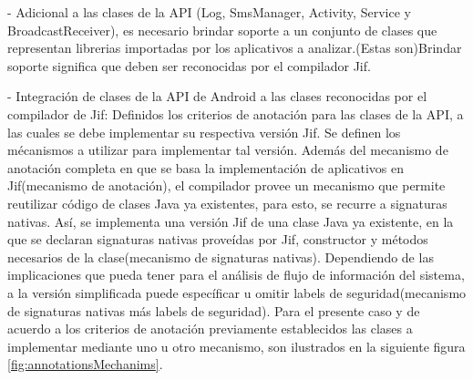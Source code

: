 - Adicional a las clases de la API (Log, SmsManager, Activity, Service y
BroadcastReceiver), es necesario brindar soporte a un conjunto de clases que
representan librerias importadas por los aplicativos a analizar.(Estas
son)Brindar soporte significa que deben ser reconocidas por el compilador Jif.

% 
- Integración de clases de la API de Android a las clases reconocidas por el
compilador de Jif:\newline
Definidos los criterios de anotación para las clases de la API, a las cuales se
debe implementar su respectiva versión Jif. Se definen los mécanismos a utilizar
para implementar tal versión. Además del mecanismo de anotación completa en que
se basa la implementación de aplicativos en Jif(mecanismo de anotación), el
compilador provee un mecanismo que permite reutilizar código de clases Java ya
existentes, para esto, se recurre a signaturas nativas. Así, se implementa una
versión Jif de una clase Java ya existente, en la que se declaran signaturas
nativas proveídas por Jif, constructor y métodos necesarios de la
clase(mecanismo de signaturas nativas).
Dependiendo de las implicaciones que pueda tener para el análisis de flujo de información del
sistema, a la versión simplificada puede específicar u omitir labels de
seguridad(mecanismo de signaturas nativas más labels de seguridad).\newline 
Para el presente caso y de acuerdo a los criterios de anotación previamente
establecidos las clases a implementar mediante uno u otro mecanismo, son
ilustrados en la siguiente figura \ref{fig:annotationsMechanims}.\newline

